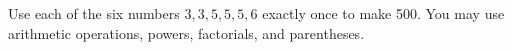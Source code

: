 Use each of the six numbers $3,3,5,5,5,6$ exactly once to make 500. You may use arithmetic operations, powers, factorials, and parentheses.
